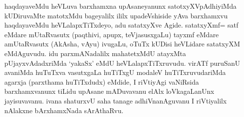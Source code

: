 \begin{artha}
haqdayaveMdu heVLuva barxhamxna upAsaneyanunx satotxyXVpAdhiyiMda kUDiruvaMte matotxMdu bageyalilx ililx upadeVshiside yAva barxhamxvu haqdayaveMdu heVLalapxTiTxdeyo, adu satatxyXve Agide.  satatxyXmf= satf eMdare mUtaRvasutx (paqthivi, apupx, teVjasusxgaLu) tayxmf eMdare amUtaRvasutx (AkAsha, vAyu) ivugaLu, oTuTx kUDisi heVLidare satatxyXM eMdAguvudu. idu parxmANadalilx mahatetxMdU atayxMta pUjayxvAdadxriMda `yakaSx' eMdU heVLalapxTiTxruvudu. virATf puruSanU avaniMda huTuTxva vasutxgaLa huTiTxgU modaleV huTiTxruvudariMda agarxja (parxthama huTiTxdudx) eMdide, I riVtiyAgi vaNiRsida barxhamxvanunx tiLidu upAsane mADuvavanu elAlx loVkagaLanUnx jayisuvavanu. ivana shaturxvU saha tanage adhiVnanAguvanu I riVtiyalilx nAlakxne bArxhamxNada sArAthaRvu.
\end{artha}

